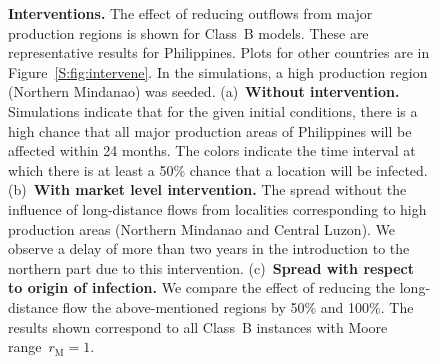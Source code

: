 \documentclass[11pt]{article}
\newcommand{\aacomment}[1]{({\color{magenta}AA: #1})}
\newcommand{\mooreRange}{r_\mathrm{M}}
\theoremstyle{definition}
\begin{document}
\begin{figure}[ht]
\begin{subfigure}[b]{.43\textwidth}
\caption{\label{fig:phlBContourBox}}
\end{subfigure}
\caption{\textbf{Interventions.} The effect of
reducing outflows from major production regions is shown for Class~B
models. These are representative results for Philippines. Plots for other
countries are in Figure~\ref{S:fig:intervene}. In the simulations, a high
production region (Northern Mindanao) was seeded. (a)~\textbf{Without
intervention.} Simulations indicate that for the given initial conditions,
there is a high chance that all major production areas of Philippines will
be affected within 24 months.  The colors indicate the time interval at
which there is at least a 50\% chance that a location will be infected.
(b)~\textbf{With market level intervention.} The spread without the
influence of long-distance flows from localities corresponding to high
production areas (Northern Mindanao and Central Luzon). We observe a delay
of more than two years in the introduction to the northern part due to this
intervention.  (c)~\textbf{Spread with respect to origin of infection.}
We compare the effect of reducing the long-distance flow the
above-mentioned regions by 50\% and 100\%. The results shown correspond to
all Class~B instances with Moore range~$\mooreRange=1$. \label{fig:intervene}}
\end{figure}
\end{document}
